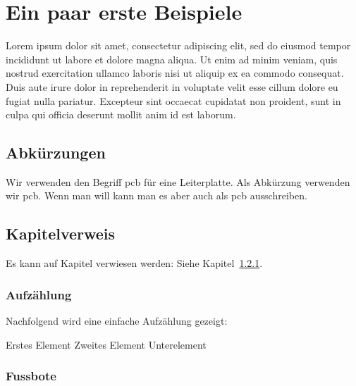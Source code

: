 \documentclass[11pt,a4paper,hidelinks]{article}
\begin{document}










\section{Ein paar erste Beispiele}\label{sec:beispiel_kapitel}

Lorem ipsum dolor sit amet, consectetur adipiscing elit, sed do eiusmod tempor incididunt ut labore et dolore magna aliqua. Ut enim ad minim veniam, quis nostrud exercitation ullamco laboris nisi ut aliquip ex ea commodo consequat. Duis aute irure dolor in reprehenderit in voluptate velit esse cillum dolore eu fugiat nulla pariatur. Excepteur sint occaecat cupidatat non proident, sunt in culpa qui officia deserunt mollit anim id est laborum.\ \cite{lipsum2022lorem}

\subsection{Abkürzungen}\label{sec:abkuerzungen}

Wir verwenden den Begriff \acrfull{pcb} für eine Leiterplatte. Als Abkürzung verwenden wir \acrshort{pcb}. Wenn man will kann man es aber auch als \acrlong{pcb} ausschreiben.

\subsection{Kapitelverweis}\label{sec:kapitelverweis}

Es kann auf Kapitel verwiesen werden: Siehe Kapitel~\ref{sec:aufzaehlung}.

\subsubsection{Aufzählung}\label{sec:aufzaehlung}

Nachfolgend wird eine einfache Aufzählung gezeigt:

\begin{outline}
    \1 Erstes Element
    \1 Zweites Element
        \2 Unterelement
\end{outline}

\subsubsection{Fussbote}\label{sec:fussnote}
\end{document}
